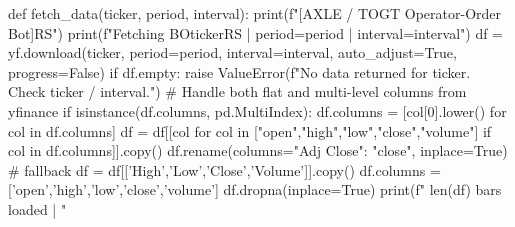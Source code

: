 def fetch_data(ticker, period, interval):
    print(f"[AXLE / TOGT Operator-Order Bot]{RS}")
    print(f"Fetching {BO}{ticker}{RS} | period={period} | interval={interval}")
    df = yf.download(ticker, period=period, interval=interval,
                     auto_adjust=True, progress=False)
    if df.empty:
        raise ValueError(f"No data returned for {ticker}. Check ticker / interval.")
    # Handle both flat and multi-level columns from yfinance
    if isinstance(df.columns, pd.MultiIndex):
        df.columns = [col[0].lower() for col in df.columns]
    df = df[[col for col in ["open","high","low","close","volume"] if col in df.columns]].copy()
    df.rename(columns={"Adj Close": "close"}, inplace=True)
    # fallback
    df = df[['High','Low','Close','Volume']].copy()
    df.columns = ['open','high','low','close','volume']
    df.dropna(inplace=True)
    print(f"  {len(df)} bars loaded  |  "
